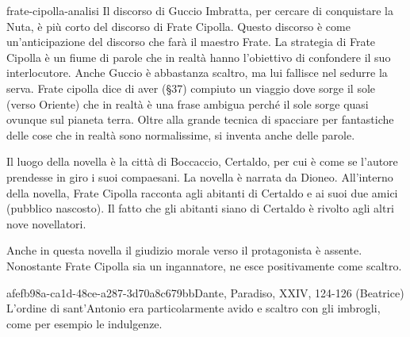 \documentclass[preview]{standalone}
\begin{document}
\begin{snippet}{frate-cipolla-analisi}
    Il discorso di Guccio Imbratta, per cercare di conquistare la Nuta, è più corto del discorso di Frate Cipolla.
    Questo discorso è come un'anticipazione del discorso che farà il maestro Frate.
    La strategia di Frate Cipolla è un fiume di parole che in realtà hanno l'obiettivo di confondere il suo interlocutore.
    Anche Guccio è abbastanza scaltro, ma lui fallisce nel sedurre la serva.
    Frate cipolla dice di aver (§37) compiuto un viaggio dove sorge il sole (verso Oriente)
    che in realtà è una frase ambigua perché il sole sorge quasi ovunque sul pianeta terra.
    Oltre alla grande tecnica di spacciare per fantastiche delle cose che in realtà sono normalissime,
    si inventa anche delle parole.
    
    Il luogo della novella è la città di Boccaccio, Certaldo, per cui è come se l'autore prendesse in giro i suoi compaesani.
    La novella è narrata da Dioneo.
    All'interno della novella, Frate Cipolla racconta agli abitanti di Certaldo e ai suoi due amici (pubblico nascosto).
    Il fatto che gli abitanti siano di Certaldo è rivolto agli altri nove novellatori.
    
    Anche in questa novella il giudizio morale verso il protagonista è assente.
    Nonostante Frate Cipolla sia un ingannatore, ne esce positivamente come scaltro.
\end{snippet}

\begin{snote}{afefb98a-ca1d-48ce-a287-3d70a8c679bb}{Dante, Paradiso, XXIV, 124-126 (Beatrice)}
    L'ordine di sant'Antonio era particolarmente avido e scaltro con gli imbrogli,
    come per esempio le indulgenze.
\end{snote}
\end{document}
